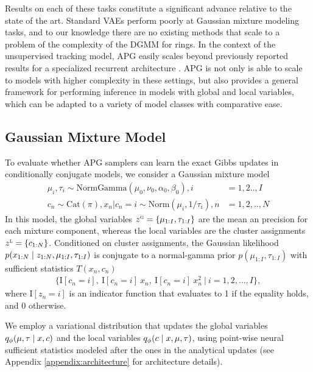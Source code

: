 \documentclass[anonymous=false, %
               format=acmsmall, %
               review=true, %
               screen=true, %
               nonacm=true]{acmart}
\theoremstyle{definition}
\begin{document}
Results on each of these tasks constitute a significant advance relative to the state of the art. Standard VAEs perform poorly at Gaussian mixture modeling tasks, and to our knowledge there are no existing methods that scale to a problem of the complexity of the DGMM for rings. In the context of the unsupervised tracking model, APG easily scales beyond previously reported results for a specialized recurrent architecture \cite{kosiorek2018sequential}. APG is not only is able to scale to models with higher complexity in these settings, but also provides a general framework for performing inference in models with global and local variables, which can be adapted to a variety of model classes with comparative ease.

\subsection{Gaussian Mixture Model}
\label{sec:gmm}
\vspace{-0.5em}
To evaluate whether APG samplers can learn the exact Gibbs updates in conditionally conjugate models, we consider a Gaussian mixture model 
\begin{align*}
    \mu_i, \tau_i \sim \text{NormGamma}(\mu_0, \nu_0, \alpha_0, \beta_0)
    , i &=1,2..,I \\
    c_n \sim \mathrm{Cat}(\pi), 
    x_n | c_n\!=\!i \sim \text{Norm}(\mu_i, 1 / \tau_i)
    ,n &=1,2,..,N
\end{align*}
In this model, the global variables $z^\textsc{g} = \{\mu_{1:I}, \tau_{1:I}\}$ are the mean an precision for each mixture component, whereas the local variables are the cluster assignments $z^\textsc{l} = \{c_{1:N}\}$. Conditioned on cluster assignments, the Gaussian likelihood $p(x_{1:N} \mid z_{1:N}, \mu_{1:I}, \tau_{1:I})$ is conjugate to a normal-gamma prior $p(\mu_{1:I}, \tau_{1:I})$ with sufficient statistics $T(x_n, c_n)$ 
\begin{align*}
    \Big\{\mathrm{I}[c_n \!=\! i], 
        ~\mathrm{I}[c_n \!=\! i] \: x_n, 
        ~\mathrm{I}[c_n \!=\! i] \: x_n^2 
        ~\Big\vert~ i \!=\! 1,2,\dots,I 
    \Big\}
    ,
\end{align*}
where $\mathrm{I}[z_n \!=\! i]$ is an indicator function that evaluates to 1 if the equality holds, and 0 otherwise.

We employ a variational distribution that updates the global variables $q_\phi(\mu, \tau \mid x, c)$ and the local variables $q_\phi(c \mid x, \mu, \tau)$, using point-wise neural sufficient statistics modeled after the ones in the analytical updates (see Appendix \ref{appendix:architecture} for architecture details).
\end{document}
